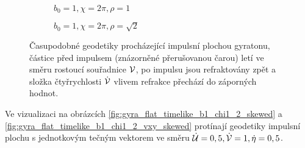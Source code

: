 \begin{figure}[H]
    \centering
    \begin{subfigure}[b]{0.48\textwidth}
        \caption{$b_0=1, \chi=2\pi, \rho=1$}
    \end{subfigure}
    \begin{subfigure}[b]{0.48\textwidth}
        \caption{$b_0=1, \chi=2\pi, \rho=\sqrt{2}$} 
    \end{subfigure}
    \caption{Časupodobné geodetiky procházející impulsní plochou gyratonu, částice před impulsem (znázorněné přerušovanou čarou)
    letí ve směru rostoucí souřadnice $\mathcal{V}$, po impulsu jsou refraktovány zpět a složka čtyřrychlosti $\dot{\mathcal{V}}$ vlivem refrakce přechází do záporných hodnot.}
    \label{fig:gyra_flat_timelike_b1_chi2_vxy}
\end{figure}

Ve vizualizaci na obrázcích \ref{fig:gyra_flat_timelike_b1_chi1_2_skewed} a \ref{fig:gyra_flat_timelike_b1_chi1_2_vxy_skewed} protínají geodetiky impulsní plochu s jednotkovým tečným vektorem
ve směru $\dot{\mathcal{U}} = 0,5, \dot{\mathcal{V}} = 1, \dot{\eta} = 0,5$.


